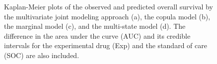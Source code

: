 \documentclass[aoas]{imsart}
\theoremstyle{plain}
\theoremstyle{remark}
\begin{document}
\begin{figure}
    \centering
    \label{fig:JMprediction}
    \label{fig:Copulaprediction}
    \hfill
    \label{fig:Marginalprediction}
    \label{fig:MSprediction}
    \caption{Kaplan-Meier plots of the observed and predicted overall survival by the multivariate joint modeling approach (a), the copula model (b), the marginal model (c), and the multi-state model (d). The difference in the area under the curve (AUC) and its credible intervals for the experimental drug (Exp) and the standard of care (SOC) are also included.}
    \label{fig:predictionKM}
\end{figure}
\end{document}
